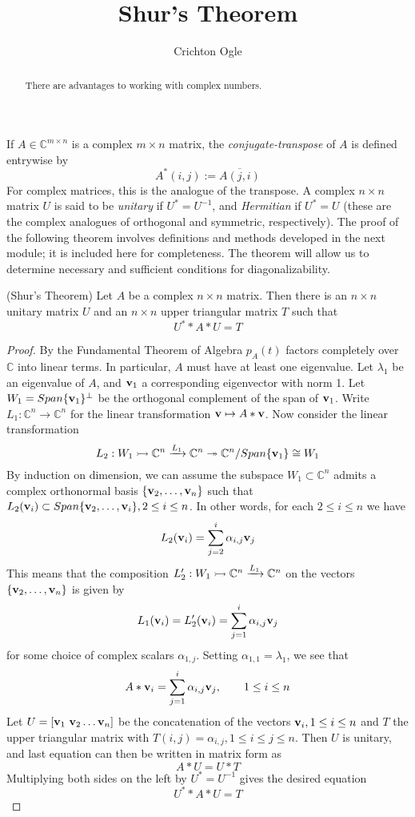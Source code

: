 \documentclass{ximera}
\title{Shur's Theorem}
\author{Crichton Ogle}
\begin{document}
\begin{abstract}
  There are advantages to working with complex numbers.
\end{abstract}
\maketitle

If $A\in \mathbb C^{m\times n}$ is a complex $m\times n$ matrix, the {\it conjugate-transpose} of $A$ is defined entrywise by
\[
A^*(i,j) := \overline{A(j,i)}
\]
For complex matrices, this is the analogue of the transpose. A complex $n\times n$ matrix $U$ is said to be {\it unitary} if $U^* = U^{-1}$, and {\it Hermitian} if $U^* = U$ (these are the complex analogues of orthogonal and symmetric, respectively). The proof of the following theorem involves definitions and methods developed in the next module; it is included here for completeness. The theorem will allow us to determine necessary and sufficient conditions for diagonalizability.

\begin{theorem} (Shur's Theorem) Let $A$ be a complex $n\times n$ matrix. Then there is an $n\times n$ unitary matrix $U$ and an $n\times n$ upper triangular matrix $T$ such that
\[
U^**A*U = T
\]
\end{theorem}

\begin{proof} By the Fundamental Theorem of Algebra $p_A(t)$ factors completely over $\mathbb C$ into linear terms. In particular, $A$ must have at least one eigenvalue.  Let $\lambda_1$ be an eigenvalue of $A$, and ${\bf v}_1$ a corresponding eigenvector with norm 1. Let $W_1 = Span\{{\bf v}_1\}^\perp$ be the orthogonal complement of the span of ${\bf v}_1$. Write $L_1:\mathbb C^n\to\mathbb C^n$ for the linear transformation ${\bf v}\mapsto A*{\bf v}$. Now consider the linear transformation
\[
L_2:W_1\rightarrowtail\mathbb C^n\xrightarrow{L_1}\mathbb C^n\twoheadrightarrow \mathbb C^n/Span\{{\bf v}_1\}\cong W_1
\]
By induction on dimension, we can assume the subspace $W_1\subset\mathbb C^n$ admits a complex orthonormal basis $\{{\bf v}_2,\dots, {\bf v}_n\}$ such that $L_2({\bf v}_i)\subset Span\{{\bf v}_2,\dots,{\bf v}_i\}, 2\le i\le n$. In other words, for each $2\le i\le n$ we have
\[
L_2({\bf v}_i) = \sum_{j=2}^i\alpha_{i,j}{\bf v}_j
\]
This means that the composition $L_2':W_1\rightarrowtail\mathbb C^n\xrightarrow{L_1}\mathbb C^n$ on the vectors $\{{\bf v}_2,\dots, {\bf v}_n\}$ is given by
\[
L_1({\bf v}_i) = L_2'({\bf v}_i) = \sum_{j=1}^i\alpha_{i,j}{\bf v}_j
\]
for some choice of complex scalars $\alpha_{1,j}$. Setting $\alpha_{1,1} = \lambda_1$, we see that
\[
A*{\bf v}_i = \sum_{j=1}^i\alpha_{i,j}{\bf v}_j,\qquad 1\le i\le n
\]
Let $U = [{\bf v}_1\ {\bf v}_2\dots {\bf v}_n]$ be the concatenation of the vectors ${\bf v}_i, 1\le i\le n$ and $T$ the upper triangular matrix with $T(i,j) = \alpha_{i,j}, 1\le i\le j\le n$. Then $U$ is unitary, and last equation can then be written in matrix form as
\[
A*U = U*T
\]
Multiplying both sides on the left by $U^* = U^{-1}$ gives the desired equation
\[
U^**A*U = T
\]
\end{proof}
\end{document}
